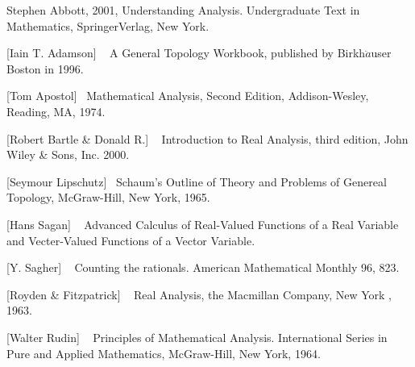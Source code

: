 \documentclass[	DIV=calc,paper=a4,fontsize=11pt]{scrartcl}	 	%
\theoremstyle{definition}
\theoremstyle{plain}
\theoremstyle{remark}
\begin{document}
\newpage

\begin{thebibliography}{9}

Stephen Abbott, 2001,
Understanding Analysis. Undergraduate Text in Mathematics, SpringerVerlag, New York.

[Iain T. Adamson] ~
A General Topology Workbook, published by Birkh$\ddot{a}$user Boston in 1996.

[Tom Apostol]~
Mathematical Analysis, Second Edition, Addison-Wesley, Reading, MA,
1974.

[Robert Bartle \& Donald R.] ~
Introduction to Real Analysis, third edition, John Wiley \& Sons, Inc. 2000.

[Seymour Lipschutz]~
Schaum's Outline of Theory and Problems of Genereal Topology, McGraw-Hill, New York, 1965.

[Hans Sagan]  ~
Advanced Calculus of Real-Valued Functions of  a Real Variable and Vecter-Valued Functions of a Vector Variable.

[Y. Sagher]  ~
Counting the rationals. American Mathematical Monthly 96, 823.

[Royden \& Fitzpatrick]  ~
Real Analysis,  the Macmillan Company, New York , 1963.

[Walter Rudin]  ~
Principles of Mathematical Analysis. International Series in Pure and Applied
Mathematics, McGraw-Hill, New York, 1964.

\end{thebibliography}
\end{document}
